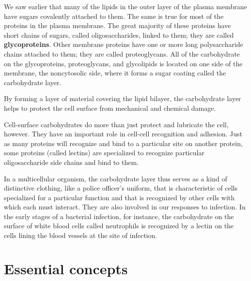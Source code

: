 We saw earlier that many of the lipids in the outer layer of the plasma
membrane have sugars covalently attached to them. The same is true
for most of the proteins in the plasma membrane. The great majority of
these proteins have short chains of sugars, called oligosaccharides, linked
to them; they are called \textbf{glycoproteins}. Other membrane proteins have
one or more long polysaccharide chains attached to them; they are called
proteoglycans. All of the carbohydrate on the glycoproteins, proteoglycans,
and glycolipids is located on one side of the membrane, the noncytosolic
side, where it forms a sugar coating called the carbohydrate layer.

By forming a layer of material covering the lipid bilayer, the carbohydrate
layer helps to protect the cell surface from mechanical and chemical
damage.

Cell-surface carbohydrates do more than just protect and lubricate the
cell, however. They have an important role in cell-cell recognition and
adhesion. Just as many proteins will recognize and bind to a particular
site on another protein, some proteins (called lectins) are specialized to
recognize particular oligosaccharide side chains and bind to them.

In a multicellular organism, the carbohydrate layer thus serves as a kind
of distinctive clothing, like a police officer’s uniform, that is characteristic
of cells specialized for a particular function and that is recognized
by other cells with which each must interact. They are also involved
in our responses to infection. In the early stages of a bacterial infection,
for instance, the carbohydrate on the surface of white blood cells called
neutrophils is recognized by a lectin on the cells lining the blood vessels
at the site of infection.

\section{Essential concepts}

